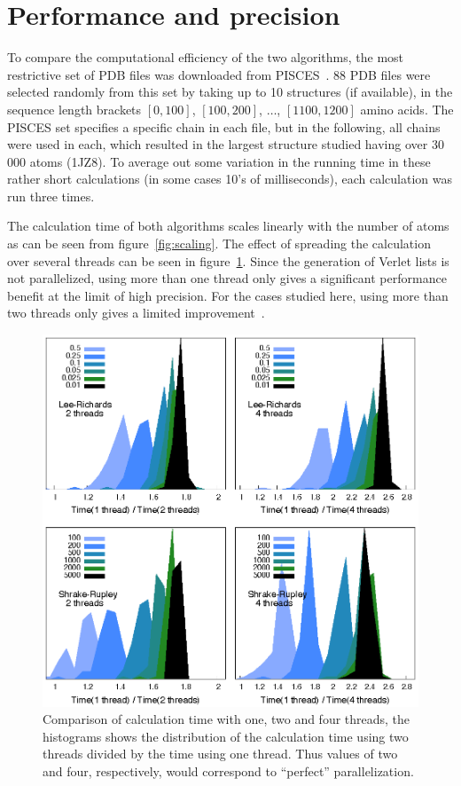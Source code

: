 \documentclass[a4paper,11pt]{article}
\begin{document}
\section{Performance and precision}\label{sec:performance}

To compare the computational efficiency of the two algorithms, the
most restrictive set of PDB files was downloaded from
PISCES~\cite{PISCES}.  88 PDB files were selected randomly from this
set by taking up to 10 structures (if available), in the sequence
length brackets $[0,100]$, $[100,200]$, $\dots$, $[1100,1200]$ amino
acids. The PISCES set specifies a specific chain in each file, but in
the following, all chains were used in each, which resulted in the
largest structure studied having over 30\,000 atoms (1JZ8). To average
out some variation in the running time in these rather short
calculations (in some cases 10's of milliseconds), each calculation was
run three times.

The calculation time of both algorithms scales linearly with the
number of atoms as can be seen from figure~\ref{fig:scaling}. The
effect of spreading the calculation over several threads can be seen
in figure~\ref{fig:threads}. Since the generation of Verlet lists is
not parallelized, using more than one thread only gives a significant
performance benefit at the limit of high precision. For the cases
studied here, using more than two threads only gives a limited
improvement~\cite{4cores}.
\begin{figure}
  \begin{center}
  \includegraphics{fig/threads} 
  \caption{Comparison of calculation time with one, two and four
    threads, the histograms shows the distribution of the calculation
    time using two threads divided by the time using one thread. Thus
    values of two and four, respectively, would correspond to
    ``perfect'' parallelization.
    \label{fig:threads}}
  \end{center}
\end{figure}
\end{document}
